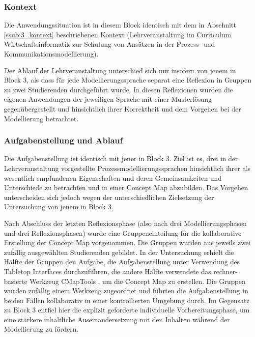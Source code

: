 \subsubsection{Kontext} %
\label{ssub:5_kontext}

Die Anwendungssituation ist in diesem Block identisch mit dem in Abschnitt \ref{ssub:3_kontext} beschriebenen Kontext (Lehrveranstaltung im Curriculum Wirtschaftsinformatik zur Schulung von Ansätzen in der Prozess- und Kommunikationsmodellierung).

Der Ablauf der Lehrveranstaltung unterschied sich nur insofern von jenem in Block 3, als dass für jede Modellierungssprache separat eine Reflexion in Gruppen zu zwei Studierenden durchgeführt wurde. In diesen Reflexionen wurden die eigenen Anwendungen der jeweiligen Sprache mit einer Musterlösung gegenübergestellt und hinsichtlich ihrer Korrektheit und dem Vorgehen bei der Modellierung betrachtet.


\subsubsection{Aufgabenstellung und Ablauf} %
\label{ssub:5_aufgabenstellung}

Die Aufgabenstellung ist identisch mit jener in Block 3. Ziel ist es, drei in der Lehrveranstaltung vorgestellte Prozessmodellierungssprachen hinsichtlich ihrer als wesentlich empfundenen Eigenschaften und deren Gemeinsamkeiten und Unterschiede zu betrachten und in einer Concept Map abzubilden. Das Vorgehen unterscheiden sich jedoch wegen der unterschiedlichen Zielsetzung der Untersuchung von jenem in Block 3.

Nach Abschluss der letzten Reflexionsphase (also nach drei Modellierungsphasen und drei Reflexionsphasen) wurde eine Gruppeneinteilung für die kollaborative Erstellung der Concept Map vorgenommen. Die Gruppen wurden aus jeweils zwei zufällig ausgewählten Studierenden gebildet. In der Untersuchung erhielt die Hälfte der Gruppen den Aufgabe, die Aufgabenstellung unter Verwendung des Tabletop Interfaces durchzuführen, die andere Hälfte verwendete das rechner-basierte Werkzeug CMapTools \citep{Canas04}, um die Concept Map zu erstellen. Die Gruppen wurden zufällig einem Werkzeug zugeordnet und führten die Aufgabenstellung in beiden Fällen kollaborativ in einer kontrollierten Umgebung durch. Im Gegensatz zu Block 3 entfiel hier die explizit geforderte individuelle Vorbereitungsphase, um eine stärkere inhaltliche Auseinandersetzung mit den Inhalten während der Modellierung zu fördern. 

